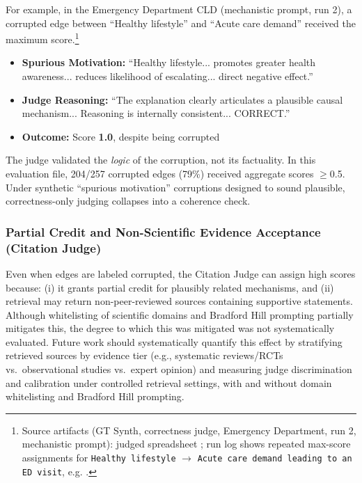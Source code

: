 For example, in the Emergency Department CLD (mechanistic prompt, run 2), a corrupted edge between ``Healthy lifestyle'' and ``Acute care demand'' received the maximum score.\footnote{Source artifacts (GT Synth, correctness judge, Emergency Department, run 2, mechanistic prompt): judged spreadsheet \texttt{}; run log shows repeated max-score assignments for \texttt{Healthy lifestyle} $\rightarrow$ \texttt{Acute care demand leading to an ED visit}, e.g. \texttt{}.}%
\begin{itemize}[noitemsep]
    \item \textbf{Spurious Motivation:} ``Healthy lifestyle... promotes greater health awareness... reduces likelihood of escalating... direct negative effect.''
    \item \textbf{Judge Reasoning:} ``The explanation clearly articulates a plausible causal mechanism... Reasoning is internally consistent... CORRECT.''
    \item \textbf{Outcome:} Score \textbf{1.0}, despite being corrupted
\end{itemize}

The judge validated the \textit{logic} of the corruption, not its factuality. In this evaluation file, 204/257 corrupted edges (79\%) received aggregate scores $\geq$0.5. Under synthetic ``spurious motivation'' corruptions designed to sound plausible, correctness-only judging collapses into a coherence check.

\subsubsection{Partial Credit and Non-Scientific Evidence Acceptance (Citation Judge)}

Even when edges are labeled corrupted, the Citation Judge can assign high scores because: (i) it grants partial credit for plausibly related mechanisms, and (ii) retrieval may return non-peer-reviewed sources containing supportive statements. Although whitelisting of scientific domains and Bradford Hill prompting partially mitigates this, the degree to which this was mitigated was not systematically evaluated. Future work should systematically quantify this effect by stratifying retrieved sources by evidence tier (e.g., systematic reviews/RCTs vs.\ observational studies vs.\ expert opinion) and measuring judge discrimination and calibration under controlled retrieval settings, with and without domain whitelisting and Bradford Hill prompting.

